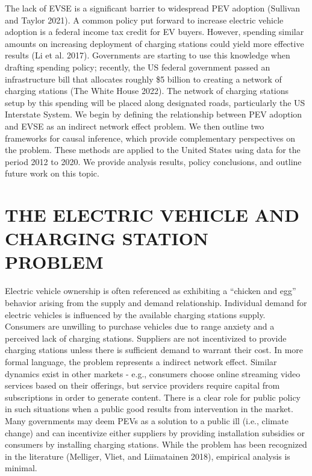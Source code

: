 \documentclass[
  letterpaper,
  DIV=11,
  numbers=noendperiod]{scrartcl}
\begin{document}
The lack of EVSE is a significant barrier to widespread PEV adoption
(Sullivan and Taylor 2021). A common policy put forward to increase
electric vehicle adoption is a federal income tax credit for EV buyers.
However, spending similar amounts on increasing deployment of charging
stations could yield more effective results (Li et al. 2017).
Governments are starting to use this knowledge when drafting spending
policy; recently, the US federal government passed an infrastructure
bill that allocates roughly \$5 billion to creating a network of
charging stations (The White House 2022). The network of charging
stations setup by this spending will be placed along designated roads,
particularly the US Interstate System. We begin by defining the
relationship between PEV adoption and EVSE as an indirect network effect
problem. We then outline two frameworks for causal inference, which
provide complementary perspectives on the problem. These methods are
applied to the United States using data for the period 2012 to 2020. We
provide analysis results, policy conclusions, and outline future work on
this topic.

\hypertarget{the-electric-vehicle-and-charging-station-problem}{%
\section{THE ELECTRIC VEHICLE AND CHARGING STATION
PROBLEM}\label{the-electric-vehicle-and-charging-station-problem}}

Electric vehicle ownership is often referenced as exhibiting a ``chicken
and egg'' behavior arising from the supply and demand relationship.
Individual demand for electric vehicles is influenced by the available
charging stations supply. Consumers are unwilling to purchase vehicles
due to range anxiety and a perceived lack of charging stations.
Suppliers are not incentivized to provide charging stations unless there
is sufficient demand to warrant their cost. In more formal language, the
problem represents a indirect network effect. Similar dynamics exist in
other markets - e.g., consumers choose online streaming video services
based on their offerings, but service providers require capital from
subscriptions in order to generate content. There is a clear role for
public policy in such situations when a public good results from
intervention in the market. Many governments may deem PEVs as a solution
to a public ill (i.e., climate change) and can incentivize either
suppliers by providing installation subsidies or consumers by installing
charging stations. While the problem has been recognized in the
literature (Melliger, Vliet, and Liimatainen 2018), empirical analysis
is minimal.
\end{document}
